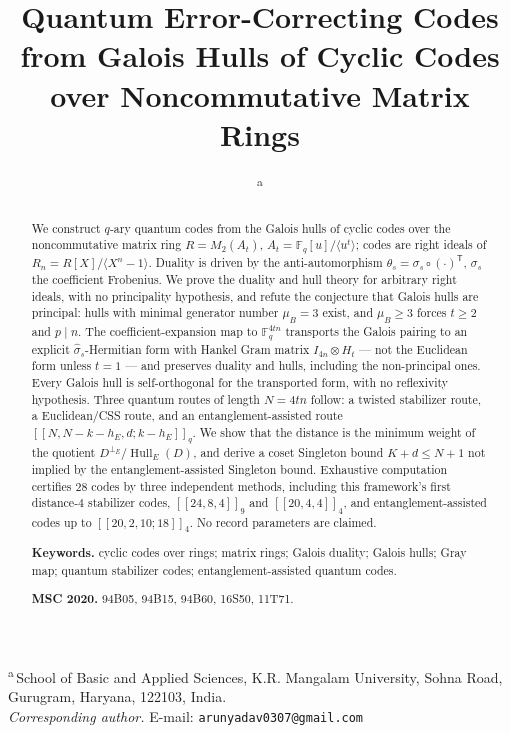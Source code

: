 \documentclass[11pt,a4paper]{article}
\title{Quantum Error-Correcting Codes from Galois Hulls of Cyclic
       Codes over Noncommutative Matrix Rings}
\author{\AUTHORONE\textsuperscript{a}}
\date{}
\makeatletter
\newcommand{\F}{\mathbb F}
\newcommand{\Hull}{\operatorname{Hull}}
\newcommand{\MU}{\mu}
\theoremstyle{plain}
\theoremstyle{definition}
\theoremstyle{remark}
\newcommand{\AUTHORONEINST}{School of Basic and Applied Sciences}
\newcommand{\AUTHORONEORG}{K.R. Mangalam University}
\newcommand{\AUTHORONEADDR}{Sohna Road, Gurugram, Haryana, 122103}
\newcommand{\AUTHORONECOUNTRY}{India}
\newcommand{\CORRESPONDINGEMAIL}{arunyadav0307@gmail.com}
\newcommand{\AFFILIATIONBLOCK}{%
  \begin{center}\small
  \textsuperscript{a}\,\AUTHORONEINST, \AUTHORONEORG,
  \AUTHORONEADDR, \AUTHORONECOUNTRY.\\[2pt]
  \textit{Corresponding author.} E-mail: \texttt{\CORRESPONDINGEMAIL}
  \end{center}}
\makeatother
\begin{document}
\maketitle
\AFFILIATIONBLOCK

\begin{abstract}
We construct $q$-ary quantum codes from the Galois hulls of cyclic codes over
the noncommutative matrix ring $R=M_2(A_t)$,
$A_t=\F_q[u]/\langle u^t\rangle$; codes are right ideals of
$R_n=R[X]/\langle X^n-1\rangle$.  Duality is driven by the anti-automorphism
$\theta_s=\sigma_s\circ(\cdot)^{\mathsf T}$, $\sigma_s$ the coefficient
Frobenius.  We prove the duality and hull theory for arbitrary right ideals,
with no principality hypothesis, and refute the conjecture that Galois hulls
are principal: hulls with minimal generator number $\MU_B=3$ exist, and
$\MU_B\ge3$ forces $t\ge2$ and $p\mid n$.  The coefficient-expansion map to
$\F_q^{4tn}$ transports the Galois pairing to an explicit
$\widehat\sigma_s$-Hermitian form with Hankel Gram matrix
$I_{4n}\otimes H_t$ --- not the Euclidean form unless $t=1$ --- and preserves
duality and hulls, including the non-principal ones.  Every Galois hull is
self-orthogonal for the transported form, with no reflexivity hypothesis.
Three quantum routes of length $N=4tn$ follow: a twisted stabilizer route, a
Euclidean/CSS route, and an entanglement-assisted route
$[[N,N-k-h_E,d;k-h_E]]_q$.  We show that the distance is the minimum weight of
the quotient $D^{\perp_E}/\Hull_E(D)$, and derive a coset Singleton bound
$K+d\le N+1$ not implied by the entanglement-assisted Singleton bound.
Exhaustive computation certifies $28$ codes by three independent methods,
including this framework's first distance-$4$ stabilizer codes,
$[[24,8,4]]_9$ and $[[20,4,4]]_4$, and entanglement-assisted codes up
to $[[20,2,10;18]]_4$.  No record parameters are claimed.

\smallskip
\noindent\textbf{Keywords.} cyclic codes over rings; matrix rings; Galois
duality; Galois hulls; Gray map; quantum stabilizer codes;
entanglement-assisted quantum codes.

\smallskip
\noindent\textbf{MSC 2020.} 94B05, 94B15, 94B60, 16S50, 11T71.
\end{abstract}

\tableofcontents
\bigskip











\end{document}
